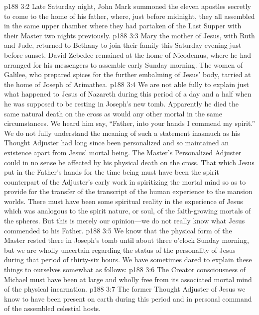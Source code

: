 \vs p188 3:2 Late Saturday night, John Mark summoned the eleven apostles secretly to come to the home of his father, where, just before midnight, they all assembled in the same upper chamber where they had partaken of the Last Supper with their Master two nights previously.
\vs p188 3:3 Mary the mother of Jesus, with Ruth and Jude, returned to Bethany to join their family this Saturday evening just before sunset. David Zebedee remained at the home of Nicodemus, where he had arranged for his messengers to assemble early Sunday morning. The women of Galilee, who prepared spices for the further embalming of Jesus’ body, tarried at the home of Joseph of Arimathea.
\pc \vs p188 3:4 We are not able fully to explain just what happened to Jesus of Nazareth during this period of a day and a half when he was supposed to be resting in Joseph’s new tomb. Apparently he died the same natural death on the cross as would any other mortal in the same circumstances. We heard him say, \textcolor{ubdarkred}{“Father, into your hands I commend my spirit.”} We do not fully understand the meaning of such a statement inasmuch as his Thought Adjuster had long since been personalized and so maintained an existence apart from Jesus’ mortal being. The Master’s Personalized Adjuster could in no sense be affected by his physical death on the cross. That which Jesus put in the Father’s hands for the time being must have been the spirit counterpart of the Adjuster’s early work in spiritizing the mortal mind so as to provide for the transfer of the transcript of the human experience to the mansion worlds. There must have been some spiritual reality in the experience of Jesus which was analogous to the spirit nature, or soul, of the faith\hyp{}growing mortals of the spheres. But this is merely our opinion---we do not really know what Jesus commended to his Father.
\vs p188 3:5 We know that the physical form of the Master rested there in Joseph’s tomb until about three o’clock Sunday morning, but we are wholly uncertain regarding the status of the personality of Jesus during that period of thirty\hyp{}six hours. We have sometimes dared to explain these things to ourselves somewhat as follows:
\pc \vs p188 3:6 \bibnobreakspace The Creator consciousness of Michael must have been at large and wholly free from its associated mortal mind of the physical incarnation.
\pc \vs p188 3:7 \bibnobreakspace The former Thought Adjuster of Jesus we know to have been present on earth during this period and in personal command of the assembled celestial hosts.
